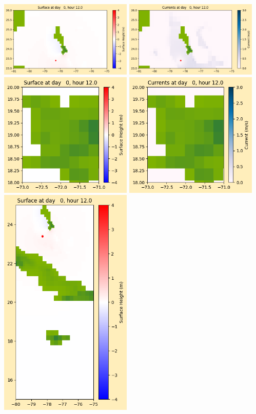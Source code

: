 \documentclass[11pt]{article}
\begin{document}
\vskip 10pt 
\includegraphics[width=0.475\textwidth]{frame0014fig1003.png}
\includegraphics[width=0.475\textwidth]{frame0014fig1004.png}
\vskip 10pt 
\includegraphics[width=0.475\textwidth]{frame0014fig1005.png}
\includegraphics[width=0.475\textwidth]{frame0014fig1006.png}
\vskip 10pt 
\includegraphics[width=0.475\textwidth]{frame0014fig1007.png}
\end{document}
